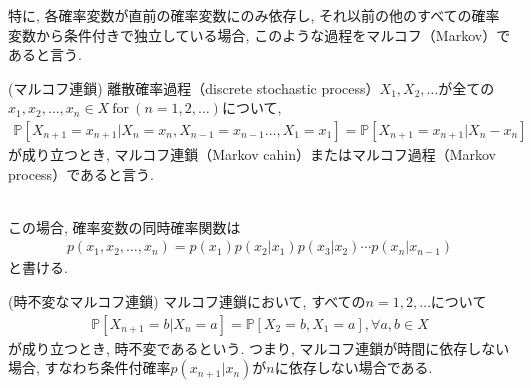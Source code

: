 \documentclass[a4j]{jsarticle}
\begin{document}
特に, 各確率変数が直前の確率変数にのみ依存し, それ以前の他のすべての確率変数から条件付きで独立している場合, このような過程をマルコフ（Markov）であると言う. \\

\begin{itembox}[l]{ (マルコフ連鎖)}
	離散確率過程（discrete stochastic process）$X_1, X_2, \ldots$が全ての$x_1, x_2, \ldots, x_n \in X \: \mbox{for} \: (n =1, 2, \ldots)$について,
	\begin{align}
		\mathbb{P}[X_{n+1} = x_{n+1} | X_n =x_n, X_{n-1} = x_{n-1} \ldots, X_1 = x_1] = \mathbb{P}[X_{n+1} = x_{n+1} | X_n - x_n]
	\end{align}
	が成り立つとき, マルコフ連鎖（Markov cahin）またはマルコフ過程（Markov process）であると言う.
\end{itembox}\\

この場合, 確率変数の同時確率関数は
\begin{align}
	p(x_1, x_2, \ldots, x_n) = p(x_1)p(x_2|x_1)p(x_3|x_2) \dotsm p(x_n|x_{n-1})
\end{align}
と書ける.\\

\begin{itembox}[l]{ (時不変なマルコフ連鎖)}
	マルコフ連鎖において, すべての$n = 1, 2, \ldots$について
	\begin{align}
		\mathbb{P}[X_{n+1} = b | X_n = a] = \mathbb{P}[X_2 = b, X_1 = a], \forall a, b \in X
	\end{align}
	が成り立つとき, 時不変であるという.
	つまり, マルコフ連鎖が時間に依存しない場合, すなわち条件付確率$p(x_{n+1}|x_n)$が$n$に依存しない場合である.
\end{itembox}\\
\end{document}
